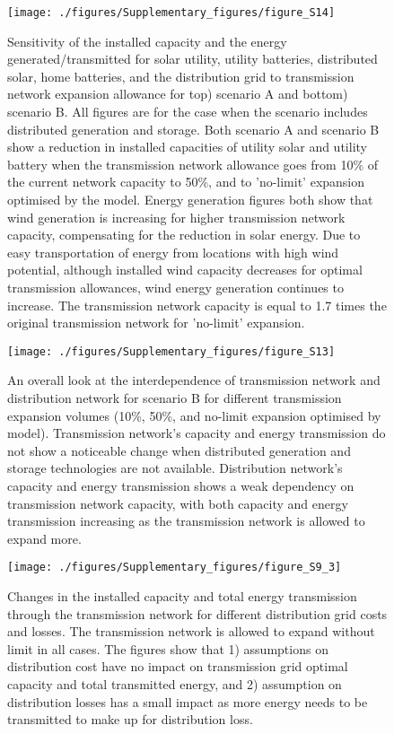 \begin{figure}[H]
\renewcommand*{\thefigure}{S\arabic{figure}}

\texttt{[image: ./figures/Supplementary\_figures/figure\_S14]}   %
\caption{Sensitivity of the installed capacity and the energy generated/transmitted for solar utility, utility batteries, distributed solar, home batteries, and the distribution grid to transmission network expansion allowance for top) scenario A and bottom) scenario B. All figures are for the case when the scenario includes distributed generation and storage. Both scenario A and scenario B show a reduction in installed capacities of utility solar and utility battery when the transmission network allowance goes from 10\% of the current network capacity to 50\%, and to 'no-limit' expansion optimised by the model. Energy generation figures both show that wind generation is increasing for higher transmission network capacity, compensating for the reduction in solar energy. Due to easy transportation of energy from locations with high wind potential, although installed wind capacity decreases for optimal transmission allowances, wind energy generation continues to increase. The transmission network capacity is equal to 1.7 times the original transmission network for 'no-limit' expansion. }
\end{figure}

\begin{figure}[H]
\renewcommand*{\thefigure}{S\arabic{figure}}

\texttt{[image: ./figures/Supplementary\_figures/figure\_S13]}   %
\caption{An overall look at the interdependence of transmission network and distribution network for scenario B for different transmission expansion volumes (10\%, 50\%, and no-limit expansion optimised by model). Transmission network's capacity and energy transmission do not show a noticeable change when distributed generation and storage technologies are not available. Distribution network's capacity and energy transmission shows a weak dependency on transmission network capacity, with both capacity and energy transmission increasing as the transmission network is allowed to expand more.}
\end{figure}

\begin{figure}[H]
\renewcommand*{\thefigure}{S\arabic{figure}}

\texttt{[image: ./figures/Supplementary\_figures/figure\_S9\_3]}   %
\caption{Changes in the installed capacity and total energy transmission through the transmission network for different distribution grid costs and losses. The transmission network is allowed to expand without limit in all cases. The figures show that 1) assumptions on distribution cost have no impact on transmission grid optimal capacity and total transmitted energy, and 2) assumption on distribution losses has a small impact as more energy needs to be transmitted to make up for distribution loss. 
}
\end{figure}

